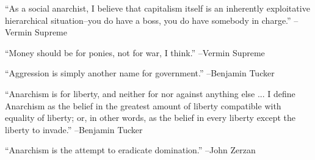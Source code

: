 \documentclass{article}%
\begin{document}
\linebreak%
\vspace{1mm}%
\begin{minipage}{\textwidth}%
\flushleft%
“As a social anarchist, I believe that capitalism itself is an inherently exploitative hierarchical situation–you do have a boss, you do have somebody in charge.”%
\linebreak%
\vspace{1mm}%
–Vermin Supreme%
\linebreak%
\vspace{1mm}%
\end{minipage}%
\linebreak%
\vspace{1mm}%
\begin{minipage}{\textwidth}%
\flushleft%
“Money should be for ponies, not for war, I think.”%
\linebreak%
\vspace{1mm}%
–Vermin Supreme%
\linebreak%
\vspace{1mm}%
\end{minipage}%
\linebreak%
\vspace{1mm}%
\begin{minipage}{\textwidth}%
\flushleft%
“Aggression is simply another name for government.”%
\linebreak%
\vspace{1mm}%
–Benjamin Tucker%
\linebreak%
\vspace{1mm}%
\end{minipage}%
\linebreak%
\vspace{1mm}%
\begin{minipage}{\textwidth}%
\flushleft%
“Anarchism is for liberty, and neither for nor against anything else ... I define Anarchism as the belief in the greatest amount of liberty compatible with equality of liberty; or, in other words, as the belief in every liberty except the liberty to invade.”%
\linebreak%
\vspace{1mm}%
–Benjamin Tucker%
\linebreak%
\vspace{1mm}%
\end{minipage}%
\linebreak%
\vspace{1mm}%
\begin{minipage}{\textwidth}%
\flushleft%
“Anarchism is the attempt to eradicate domination.”%
\linebreak%
\vspace{1mm}%
–John Zerzan%
\linebreak%
\vspace{1mm}%
\end{minipage}%
\linebreak%
\vspace{1mm}

%
\end{document}
